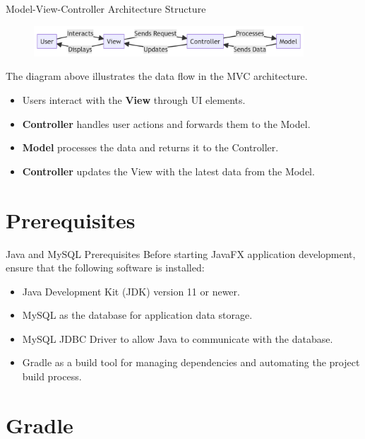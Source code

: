 \documentclass[aspectratio=169, table]{beamer}
\begin{document}
\begin{frame}{Model-View-Controller Architecture Structure}
\vspace{20pt}
\begin{figure}[ht]
	\centering
	\includegraphics[width=0.9\textwidth]{../../figures/mvc-modern.png}
	\label{fig:mvc_architecture}
\end{figure}
\vspace{10pt}
The diagram above illustrates the data flow in the MVC architecture.
\begin{itemize}
	\item Users interact with the \textbf{View} through UI elements.
	\item \textbf{Controller} handles user actions and forwards them to the Model.
	\item \textbf{Model} processes the data and returns it to the Controller.
	\item \textbf{Controller} updates the View with the latest data from the Model.
\end{itemize}
\end{frame}

\section{Prerequisites}
\begin{frame}{Java and MySQL Prerequisites}
\vspace{20pt}
Before starting JavaFX application development, ensure that the following software is installed:
\begin{itemize}
	\item Java Development Kit (JDK) version 11 or newer.
	\item MySQL as the database for application data storage.
	\item MySQL JDBC Driver to allow Java to communicate with the database.
	\item Gradle as a build tool for managing dependencies and automating the project build process.
\end{itemize}
\end{frame}
\section{Gradle}
\end{document}
